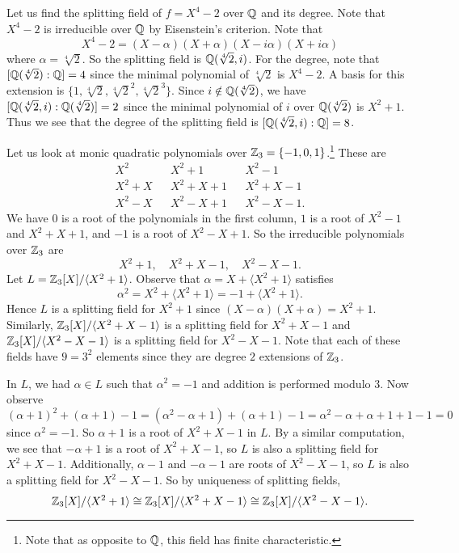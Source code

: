 \begin{example}
  Let us find the splitting field of $f = X^4 - 2$ over
  $\mathbb{Q}$ and its degree. Note that $X^4 - 2$ is
  irreducible over $\mathbb{Q}$ by Eisenstein's criterion.
  Note that
  \[
    X^4 - 2 = (X - \alpha)(X + \alpha)(X - i \alpha)(X + i\alpha)
  \]
  where $\alpha = \sqrt[4]{2}$. So the
  splitting field is $\mathbb{Q}(\sqrt[4]{2}, i)$. For the
  degree, note that $[\mathbb{Q}(\sqrt[4]{2}) : \mathbb{Q}] = 4$ since
  the minimal polynomial of $\sqrt[4]{2}$ is $X^4 - 2$.
  A basis for this extension is $\{1, \sqrt[4]{2}, \sqrt[4]{2}^2, \sqrt[4]{2}^3\}$.
  Since $i \notin \mathbb{Q}(\sqrt[4]{2})$, we have
  $[\mathbb{Q}(\sqrt[4]{2}, i) : \mathbb{Q}(\sqrt[4]{2})] = 2$ since
  the minimal polynomial of $i$ over $\mathbb{Q}(\sqrt[4]{2})$
  is $X^2 + 1$. Thus we see that the degree of the
  splitting field
  is $[\mathbb{Q}(\sqrt[4]{2}, i) : \mathbb{Q}] = 8$.
\end{example}

\begin{example}
  Let us look at monic quadratic polynomials
  over $\mathbb{Z}_3 = \{-1, 0, 1\}$.\footnote{Note that as opposite to $\mathbb{Q}$, this field has finite characteristic.}
  These are
  \[
  \begin{array}{ccccc}
    X^2 & & X^2 + 1 & & X^2 - 1 \\
    X^2 + X & & X^2 + X + 1 & & X^2 + X - 1 \\
    X^2 - X & & X^2 - X + 1 & & X^2 - X - 1.
  \end{array}
  \]
  We have $0$ is a root of the polynomials in the
  first column, $1$ is a root of $X^2 - 1$ and
  $X^2 + X + 1$, and $-1$ is a root of $X^2 - X + 1$.
  So the irreducible polynomials over $\mathbb{Z}_3$ are
  \[
    X^2 + 1, \quad X^2 + X - 1, \quad X^2 - X - 1.
  \]
  Let $L = \mathbb{Z}_3[X] / \langle X^2 + 1 \rangle$. Observe
  that $\alpha = X + \langle X^2 + 1 \rangle$ satisfies
  \[
    \alpha^2 = X^2 + \langle X^2 + 1 \rangle
    = -1 + \langle X^2 + 1 \rangle.
  \]
  Hence $L$ is a splitting field for $X^2 + 1$ since
  $(X - \alpha)(X + \alpha) = X^2 + 1$.
  Similarly,
  $\mathbb{Z}_3[X] / \langle X^2 + X - 1 \rangle$ is a
  splitting field for $X^2 + X - 1$ and
  $\mathbb{Z}_3[X] / \langle X^2 - X - 1 \rangle$ is a
  splitting field for $X^2 - X - 1$. Note that each of
  these fields have $9 = 3^2$ elements since they are
  degree $2$ extensions of $\mathbb{Z}_3$.
\end{example}

\begin{remark}
  In $L$, we had $\alpha \in L$ such that
  $\alpha^2 = - 1$ and addition is performed modulo $3$.
  Now observe
  \[
    (\alpha + 1)^2 + (\alpha + 1) - 1
    = (\alpha^2 - \alpha + 1) + (\alpha + 1) - 1
    = \alpha^2 - \alpha + \alpha + 1 + 1 - 1
    = 0
  \]
  since $\alpha^2 = -1$. So $\alpha + 1$ is a root of
  $X^2 + X - 1$ in $L$. By a similar computation, we
  see that $- \alpha + 1$ is a root of $X^2 + X - 1$,
  so $L$ is also a splitting field for $X^2 + X - 1$.
  Additionally, $\alpha - 1$ and $-\alpha - 1$ are
  roots of $X^2 - X - 1$, so $L$ is also a splitting
  field for $X^2 - X - 1$. So by uniqueness of splitting
  fields,
  \[
    \mathbb{Z}_3[X] / \langle X^2 + 1 \rangle
    \cong \mathbb{Z}_3[X] / \langle X^2 + X - 1 \rangle
    \cong \mathbb{Z}_3[X] / \langle X^2 - X - 1 \rangle.
  \]
\end{remark}

